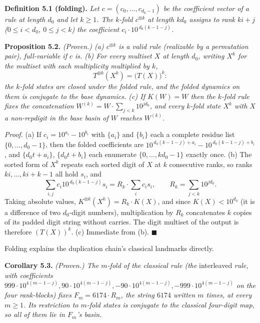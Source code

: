 \documentclass[11pt,letterpaper]{article}
\theoremstyle{paperstyle}
\theoremstyle{paperstyledef}
\theoremstyle{paperstylerem}
\begin{document}
\textbf{Definition 5.1 (folding).} \emph{Let \(c = (c_0, \dots, c_{d_0-1})\) be the coefficient vector of a rule at length \(d_0\) and let \(k \geq 1\). The \(k\)-fold \(c^{\otimes k}\) at length \(k d_0\) assigns to rank \(ki + j\) (\(0 \leq i < d_0\), \(0 \leq j < k\)) the coefficient \(c_i \cdot 10^{\,d_0 (k-1-j)}\).}

\textbf{Proposition 5.2.} \emph{(Proven.) (a) \(c^{\otimes k}\) is a valid rule (realizable by a permutation pair), full-variable if \(c\) is. (b) For every multiset \(X\) at length \(d_0\), writing \(X^k\) for the multiset with each multiplicity multiplied by \(k\),} \[T^{\otimes k}(X^k) = \bigl(T(X)\bigr)^k :\] \emph{the \(k\)-fold states are closed under the folded rule, and the folded dynamics on them is conjugate to the base dynamics. (c) If \(K(W) = W\) then the \(k\)-fold rule fixes the concatenation \(W^{(k)} = W \cdot \sum_{j<k} 10^{j d_0}\), and every \(k\)-fold state \(X^k\) with \(X\) a non-repdigit in the base basin of \(W\) reaches \(W^{(k)}\).}

\emph{Proof.} (a) If \(c_i = 10^{a_i} - 10^{b_i}\) with \(\{a_i\}\) and \(\{b_i\}\) each a complete residue list \(\{0, \dots, d_0 - 1\}\), then the folded coefficients are \(10^{\,d_0(k-1-j) + a_i} - 10^{\,d_0(k-1-j)+b_i}\), and \(\{ d_0 t + a_i \}\), \(\{ d_0 t + b_i\}\) each enumerate \(\{0, \dots, kd_0 - 1\}\) exactly once. (b) The sorted form of \(X^k\) repeats each sorted digit of \(X\) at \(k\) consecutive ranks, so ranks \(ki, \dots, ki + k - 1\) all hold \(s_i\), and \[\sum_{i,j} c_i 10^{\,d_0(k-1-j)} s_i = R_k \cdot \sum_i c_i s_i, \qquad R_k = \textstyle\sum_{j<k} 10^{j d_0}.\] Taking absolute values, \(K^{\otimes k}(X^k) = R_k \cdot K(X)\), and since \(K(X) < 10^{d_0}\) (it is a difference of two \(d_0\)-digit numbers), multiplication by \(R_k\) concatenates \(k\) copies of its padded digit string without carries. The digit multiset of the output is therefore \((T(X))^k\). (c) Immediate from (b). \(\blacksquare\)

Folding explains the duplication chain's classical landmarks directly.

\textbf{Corollary 5.3.} \emph{(Proven.) The \(m\)-fold of the classical rule (the} interleaved \emph{rule, with coefficients \(999\cdot 10^{4(m-1-j)}, 90 \cdot 10^{4(m-1-j)}, -90\cdot 10^{4(m-1-j)}, -999\cdot10^{4(m-1-j)}\) on the four rank-blocks) fixes \(F_m = 6174 \cdot R_m\), the string \(6174\) written \(m\) times, at every \(m \geq 1\). Its restriction to \(m\)-fold states is conjugate to the classical four-digit map, so all of them lie in \(F_m\)'s basin.}
\end{document}
